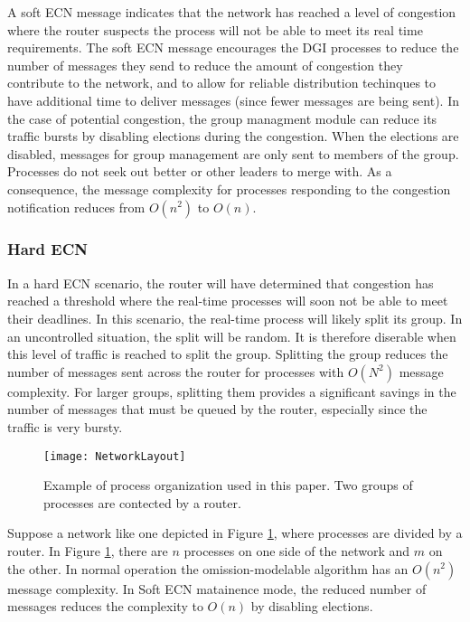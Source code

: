 A soft ECN message indicates that the network has reached a level of congestion where the router suspects the process will not be able to meet its real time requirements.
The soft ECN message encourages the DGI processes to reduce the number of messages they send to reduce the amount of congestion they contribute to the network, and to allow for reliable distribution techinques to have additional time to deliver messages (since fewer messages are being sent).
In the case of potential congestion, the group managment module can reduce its traffic bursts by disabling elections during the congestion.
When the elections are disabled, messages for group management are only sent to members of the group.
Processes do not seek out better or other leaders to merge with.
As a consequence, the message complexity for processes responding to the congestion notification reduces from $O(n^2)$ to $O(n)$.

\subsubsection{Hard ECN}

In a hard ECN scenario, the router will have determined that congestion has reached a threshold where the real-time processes will soon not be able to meet their deadlines.
In this scenario, the real-time process will likely split its group.
In an uncontrolled situation, the split will be random.
It is therefore diserable when this level of traffic is reached to split the group.
Splitting the group reduces the number of messages sent across the router for processes with $O(N^2)$ message complexity.
For larger groups, splitting them provides a significant savings in the number of messages that must be queued by the router, especially since the traffic is very bursty.

\begin{figure}
\texttt{[image: NetworkLayout]}
\caption{Example of process organization used in this paper. Two groups of processes are contected by a router.} \label{fig:network-layout}
\end{figure}

Suppose a network like one depicted in Figure \ref{fig:network-layout}, where processes are divided by a router.
In Figure \ref{fig:network-layout}, there are $n$ processes on one side of the network and $m$ on the other.
In normal operation the omission-modelable algorithm has an $O(n^2)$ message complexity.
In Soft ECN matainence mode, the reduced number of messages reduces the complexity to $O(n)$ by disabling elections.

